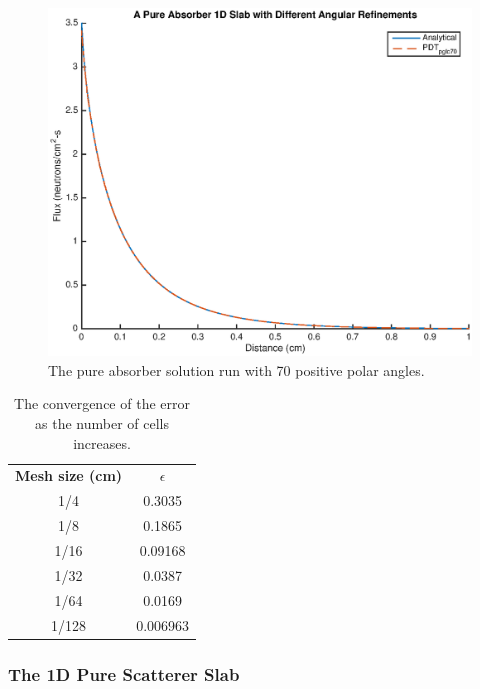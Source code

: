 \documentclass{anstrans}
\begin{document}
\begin{figure}
\centering
\includegraphics[scale = 0.5]{figures/PureAbsorberBestangle.eps}
\caption{The pure absorber solution run with 70 positive polar angles.}
\label{pa_bestangle}
\end{figure}

\begin{table}[H]
\centering
\caption{The convergence of the error as the number of cells increases.}
\begin{tabular}{c c}
\hline
\textbf{Mesh size (cm)} & \textbf{$\epsilon$} \\
1/4 & 0.3035 \\
1/8 & 0.1865 \\
1/16 & 0.09168 \\
1/32 & 0.0387 \\
1/64 & 0.0169 \\
1/128 & 0.006963 \\
\hline
\end{tabular}
\label{flux_errors}
\end{table}

\subsubsection{The 1D Pure Scatterer Slab}
\end{document}
